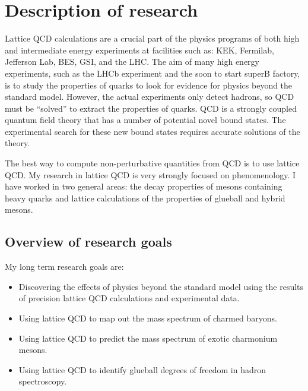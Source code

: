 

\section{Description of research}

Lattice QCD calculations are a crucial part of the physics programs of
both high and intermediate energy experiments at facilities such as:
KEK, Fermilab, Jefferson Lab, BES, GSI, and the LHC.  
The aim of many high energy experiments, such as the
LHCb experiment and the soon 
to start superB factory, is to 
study the properties of quarks to look for
evidence for physics beyond the standard model. However, the actual
experiments only detect hadrons, so QCD must be ``solved'' to extract
the properties of quarks. QCD is a strongly 
coupled quantum field theory that has a number of potential novel
bound states. The experimental search for these new bound states
requires accurate solutions of the theory.


The best way to compute non-perturbative
quantities from QCD is to use lattice QCD.
My research in lattice QCD is very strongly focused on phenomenology.
I have worked in two general areas: the decay properties of mesons
containing heavy quarks and lattice calculations of the properties of
glueball and hybrid mesons. 

\subsection{Overview of research goals}

My long term research goals are:

\begin{itemize}
\item Discovering the effects of physics beyond the standard model
      using the results of precision lattice QCD calculations
      and experimental data.

\item Using lattice QCD to map out the mass spectrum
      of charmed baryons.

\item Using lattice QCD to predict the mass spectrum of 
      exotic charmonium mesons.

\item Using lattice QCD to identify glueball degrees of freedom
      in hadron spectroscopy.

\end{itemize}


